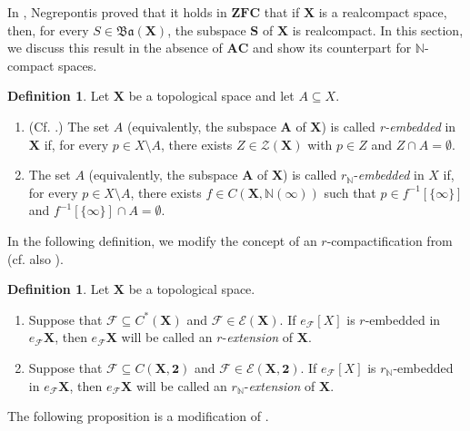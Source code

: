 \documentclass[12pt,twoside,leqno]{article}
\theoremstyle{plain}
\theoremstyle{definition}
\newtheorem{definition}[theorem]{Definition}
\theoremstyle{remark}
\begin{document}
In \cite{neg}, Negrepontis proved that it holds in $\mathbf{ZFC}$ that if $\mathbf{X}$ is a realcompact space, then, for every $S\in\mathfrak{Ba}(\mathbf{X})$, the subspace $\mathbf{S}$ of $\mathbf{X}$ is realcompact. In this section, we discuss this result in the absence of $\mathbf{AC}$ and show its counterpart for $\mathbb{N}$-compact spaces.

\begin{definition}
	\label{s7:d1}
	Let $\mathbf{X}$ be a topological space and let $A\subseteq X$.
	\begin{enumerate} 
		\item[(i)] (Cf. \cite[Definition 2.4]{neg}.) The set $A$ (equivalently, the subspace $\mathbf{A}$ of $\mathbf{X}$) is called \emph{r-embedded} in $\mathbf{X}$ if, for every $p\in X\setminus A$, there exists $Z\in\mathcal{Z}(\mathbf{X})$ with $p\in Z$ and $Z\cap A=\emptyset$.
		\item[(ii)] The set $A$ (equivalently, the subspace $\mathbf{A}$ of $\mathbf{X}$) is called $r_{\mathbb{N}}$-\emph{embedded} in $X$ if, for every $p\in X\setminus A$, there exists $f\in C(\mathbf{X},\mathbb{N}(\infty))$ such that $p\in f^{-1}[\{\infty\}]$ and $f^{-1}[\{\infty\}]\cap A=\emptyset$.
	\end{enumerate}
\end{definition}

In the following definition, we modify the concept of an $r$-compactification from \cite[Definition 2.1]{neg} (cf. also \cite{mr0}).

\begin{definition}
	\label{s7:d2}
	Let $\mathbf{X}$ be a topological space.
	\begin{enumerate}
		\item[(i)] Suppose that $\mathcal{F}\subseteq C^{\ast}(\mathbf{X})$ and $\mathcal{F}\in\mathcal{E}(\mathbf{X})$. If $e_{\mathcal{F}}[X]$ is $r$-embedded in $e_{\mathcal{F}}\mathbf{X}$, then $e_{\mathcal{F}}\mathbf{X}$ will be called an $r$-\emph{extension} of $\mathbf{X}$.
		\item[(ii)] Suppose that $\mathcal{F}\subseteq C(\mathbf{X}, \mathbf{2})$ and $\mathcal{F}\in\mathcal{E}(\mathbf{X}, \mathbf{2})$. If  $e_{\mathcal{F}}[X]$ is $r_{\mathbb{N}}$-embedded in $e_{\mathcal{F}}\mathbf{X}$, then $e_{\mathcal{F}}\mathbf{X}$ will be called an $r_{\mathbb{N}}$-\emph{extension} of $\mathbf{X}$.
	\end{enumerate}
\end{definition}

The following proposition is a modification of \cite[Proposition 2.2]{neg}.
\end{document}
